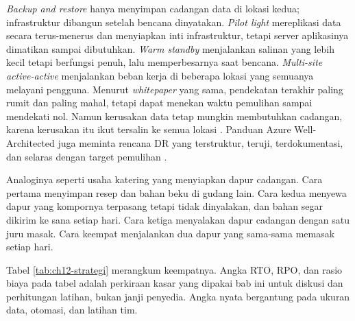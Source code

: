 \textit{Backup and restore} hanya menyimpan cadangan data di lokasi kedua; infrastruktur dibangun
setelah bencana dinyatakan. \textit{Pilot light} mereplikasi data secara terus-menerus dan
menyiapkan inti infrastruktur, tetapi server aplikasinya dimatikan sampai dibutuhkan.
\textit{Warm standby} menjalankan salinan yang lebih kecil tetapi berfungsi penuh, lalu
memperbesarnya saat bencana. \textit{Multi-site active-active} menjalankan beban kerja di beberapa
lokasi yang semuanya melayani pengguna. Menurut \textit{whitepaper} yang sama, pendekatan terakhir
paling rumit dan paling mahal, tetapi dapat menekan waktu pemulihan sampai mendekati nol. Namun
kerusakan data tetap mungkin membutuhkan cadangan, karena kerusakan itu ikut tersalin ke semua
lokasi \cite{c12-aws-dr2021}. Panduan Azure Well-Architected juga meminta rencana DR yang
terstruktur, teruji, terdokumentasi, dan selaras dengan target pemulihan \cite{c12-azure-dr}.

Analoginya seperti usaha katering yang menyiapkan dapur cadangan. Cara pertama menyimpan resep dan
bahan beku di gudang lain. Cara kedua menyewa dapur yang kompornya terpasang tetapi tidak dinyalakan,
dan bahan segar dikirim ke sana setiap hari. Cara ketiga menyalakan dapur cadangan dengan satu juru
masak. Cara keempat menjalankan dua dapur yang sama-sama memasak setiap hari.

Tabel \ref{tab:ch12-strategi} merangkum keempatnya. Angka RTO, RPO, dan rasio biaya pada tabel adalah
perkiraan kasar yang dipakai bab ini untuk diskusi dan perhitungan latihan, bukan janji penyedia.
Angka nyata bergantung pada ukuran data, otomasi, dan latihan tim.

